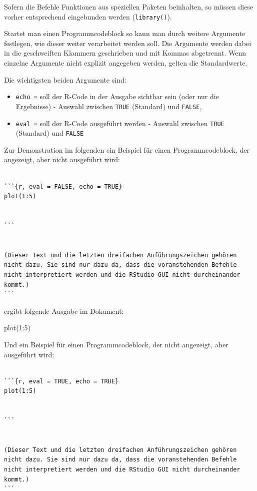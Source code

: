 \documentclass[
]{article}
\newenvironment{Shaded}{\begin{snugshade}}{\end{snugshade}}
\newcommand{\DecValTok}[1]{\textcolor[rgb]{0.00,0.00,0.81}{#1}}
\newcommand{\FunctionTok}[1]{\textcolor[rgb]{0.00,0.00,0.00}{#1}}
\newcommand{\NormalTok}[1]{#1}
\newcommand{\SpecialCharTok}[1]{\textcolor[rgb]{0.00,0.00,0.00}{#1}}
\providecommand{\tightlist}{%
  \setlength{\itemsep}{0pt}\setlength{\parskip}{0pt}}
\begin{document}
Sofern die Befehle Funktionen aus speziellen Paketen beinhalten, so
müssen diese vorher entsprechend eingebunden werden
(\texttt{library()}).

Startet man einen Programmcodeblock so kann man durch weitere Argumente
festlegen, wie dieser weiter verarbeitet werden soll. Die Argumente
werden dabei in die geschweiften Klammern geschrieben und mit Kommas
abgetrennt. Wenn einzelne Argumente nicht explizit angegeben werden,
gelten die Standardwerte.

Die wichtigsten beiden Argumente sind:

\begin{itemize}
\tightlist
\item
  \texttt{echo\ =} soll der R-Code in der Ausgabe sichtbar sein (oder
  nur die Ergebnisse) - Auswahl zwischen \texttt{TRUE} (Standard) und
  \texttt{FALSE},
\item
  \texttt{eval\ =} soll der R-Code ausgeführt werden - Auswahl zwischen
  \texttt{TRUE} (Standard) und \texttt{FALSE}
\end{itemize}

Zur Demonstration im folgenden ein Beispiel für einen Programmcodeblock,
der angezeigt, aber nicht ausgeführt wird:

\begin{verbatim}

```{r, eval = FALSE, echo = TRUE}
plot(1:5)


``` 


(Dieser Text und die letzten dreifachen Anführungszeichen gehören nicht dazu. Sie sind nur dazu da, dass die voranstehenden Befehle nicht interpretiert werden und die RStudio GUI nicht durcheinander kommt.)
```
\end{verbatim}

ergibt folgende Ausgabe im Dokument:

\begin{Shaded}
\begin{Highlighting}[]
\FunctionTok{plot}\NormalTok{(}\DecValTok{1}\SpecialCharTok{:}\DecValTok{5}\NormalTok{)}
\end{Highlighting}
\end{Shaded}

Und ein Beispiel für einen Programmcodeblock, der nicht angezeigt, aber
ausgeführt wird:

\begin{verbatim}

```{r, eval = TRUE, echo = TRUE}
plot(1:5)


``` 


(Dieser Text und die letzten dreifachen Anführungszeichen gehören nicht dazu. Sie sind nur dazu da, dass die voranstehenden Befehle nicht interpretiert werden und die RStudio GUI nicht durcheinander kommt.)
```
\end{verbatim}
\end{document}
